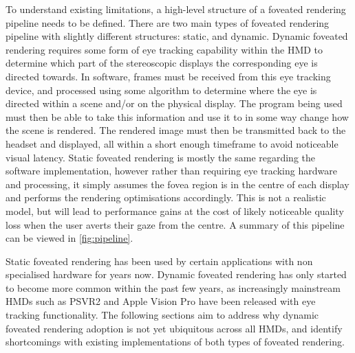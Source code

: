 \documentclass[a4paper,11pt]{article}
\begin{document}
To understand existing limitations, a high-level structure of a foveated rendering pipeline needs to be defined. There are two main types of foveated rendering pipeline with slightly different structures: static, and dynamic. Dynamic foveated rendering requires some form of eye tracking capability within the HMD to determine which part of the stereoscopic displays the corresponding eye is directed towards. In software, frames must be received from this eye tracking device, and processed using some algorithm to determine where the eye is directed within a scene and/or on the physical display. The program being used must then be able to take this information and use it to in some way change how the scene is rendered. The rendered image must then be transmitted back to the headset and displayed, all within a short enough timeframe to avoid noticeable visual latency. Static foveated rendering is mostly the same regarding the software implementation, however rather than requiring eye tracking hardware and processing, it simply assumes the fovea region is in the centre of each display and performs the rendering optimisations accordingly. This is not a realistic model, but will lead to performance gains at the cost of likely noticeable quality loss when the user averts their gaze from the centre. A summary of this pipeline can be viewed in \cref{fig:pipeline}.

Static foveated rendering has been used by certain applications with non specialised hardware for years now. Dynamic foveated rendering has only started to become more common within the past few years, as increasingly mainstream HMDs such as PSVR2\cite{} and Apple Vision Pro\cite{} have been released with eye tracking functionality. The following sections aim to address why dynamic foveated rendering adoption is not yet ubiquitous across all HMDs, and identify shortcomings with existing implementations of both types of foveated rendering.
\end{document}
